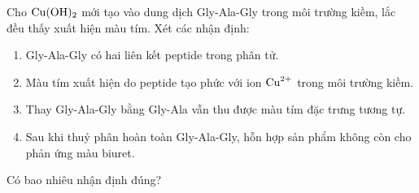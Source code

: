 \documentclass[11pt,a4paper]{article}
\begin{document}
\begin{ex}
Cho $\ce{Cu(OH)2}$ mới tạo vào dung dịch Gly-Ala-Gly trong môi trường kiềm, lắc đều thấy xuất hiện màu tím. Xét các nhận định:
\begin{enumerate}[label=(\arabic*),itemsep=1pt,leftmargin=1.8cm]
\item Gly-Ala-Gly có hai liên kết peptide trong phân tử.
\item Màu tím xuất hiện do peptide tạo phức với ion $\ce{Cu^2+}$ trong môi trường kiềm.
\item Thay Gly-Ala-Gly bằng Gly-Ala vẫn thu được màu tím đặc trưng tương tự.
\item Sau khi thuỷ phân hoàn toàn Gly-Ala-Gly, hỗn hợp sản phẩm không còn cho phản ứng màu biuret.
\end{enumerate}
Có bao nhiêu nhận định đúng?



\end{ex}
\end{document}
